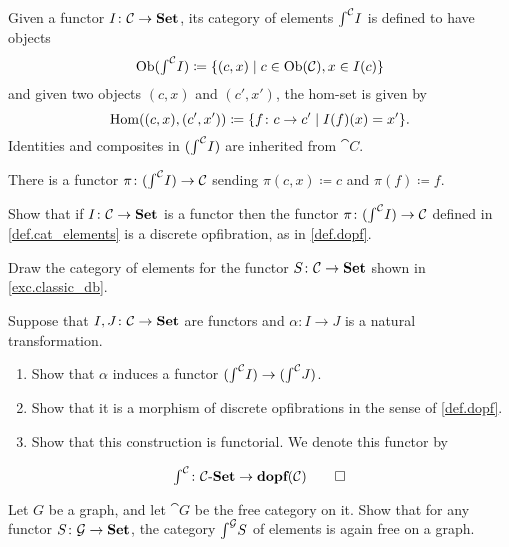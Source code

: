 \documentclass[DynamicalBook]{subfiles}
\begin{document}
\begin{definition}\label{def.cat_elements}
Given a functor $I\colon\mathcal{C}\to\textbf{Set}$, its category of elements $\textstyle{\int}^{\mathcal{C}}I$ is defined to have objects
\[
\operatorname{Ob}(\textstyle{\int}^{\mathcal{C}}I)\coloneqq\{(c,x)\mid c\in\operatorname{Ob}(\mathcal{C}), x\in I(c)\}
\]
and given two objects $(c,x)$ and $(c',x')$, the hom-set is given by
\[
\operatorname{Hom}((c,x),(c',x'))\coloneqq\{f\colon c\to c'\mid I(f)(x)=x'\}.
\]
Identities and composites in $(\textstyle{\int}^{\mathcal{C}}I)$ are inherited from $\cat{C}$.

There is a functor $\pi\colon(\textstyle{\int}^{\mathcal{C}}I)\to\mathcal{C}$ sending $\pi(c,x)\coloneqq c$ and $\pi(f)\coloneqq f$.
\end{definition}

\begin{exercise}
Show that if $I\colon\mathcal{C}\to\textbf{Set}$ is a functor then the functor $\pi\colon(\textstyle{\int}^{\mathcal{C}}I)\to\mathcal{C}$ defined in \cref{def.cat_elements} is a discrete opfibration, as in \cref{def.dopf}.
\end{exercise}

\begin{exercise}
Draw the category of elements for the functor $S\colon\mathcal{C}\to\textbf{Set}$ shown in \cref{exc.classic_db}.
\end{exercise}

\begin{exercise}\label{exc.elts_functor}
Suppose that $I,J\colon\mathcal{C}\to\textbf{Set}$ are functors and $\alpha\colon I\to J$ is a natural transformation. 
\begin{enumerate}
	\item Show that $\alpha$ induces a functor $(\textstyle{\int}^{\mathcal{C}}I)\to(\textstyle{\int}^{\mathcal{C}}J)$.
	\item Show that it is a morphism of discrete opfibrations in the sense of \cref{def.dopf}.
	\item Show that this construction is functorial. We denote this functor by
\end{enumerate}
	\[
	\textstyle{\int}^{\mathcal{C}}\colon\mathcal{C}\textnormal{-}\textbf{Set}\to\textbf{dopf}(\mathcal{C})
\qedhere	
	\]
\end{exercise}

\begin{exercise}\label{exc.elts_free_grph}
Let $G$ be a graph, and let $\cat{G}$ be the free category on it. Show that for any functor $S\colon\mathcal{G}\to\textbf{Set}$, the category $\textstyle{\int}^{\mathcal{G}} S$ of elements is again free on a graph.
\end{exercise}
\end{document}
